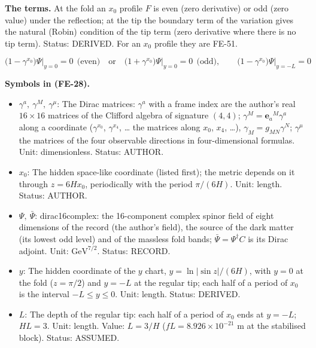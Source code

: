 \documentclass[
  10pt,
]{article}
\providecommand{\tightlist}{%
  \setlength{\itemsep}{0pt}\setlength{\parskip}{0pt}}
\begin{document}
\textbf{The terms.} At the fold an \(x_0\) profile \(F\) is even (zero
derivative) or odd (zero value) under the reflection; at the tip the
boundary term of the variation gives the natural (Robin) condition of
the tip term (zero derivative where there is no tip term). Status:
DERIVED. For an \(x_0\) profile they are FE-51.

\[
\big(1 - \gamma^{x_0}\big)\Psi\big\vert_{y=0} = 0\ \ \text{(even)}\quad\text{or}\quad
\big(1 + \gamma^{x_0}\big)\Psi\big\vert_{y=0} = 0\ \ \text{(odd)},\qquad
\big(1 - \gamma^{x_0}\big)\Psi\big\vert_{y=-L} = 0 \tag{FE-28}
\]

\textbf{Symbols in (FE-28).}

\begin{itemize}
\tightlist
\item
  \(\gamma^a,\ \gamma^M,\ \gamma^\mu\): The Dirac matrices: \(\gamma^a\)
  with a frame index are the author's real \(16 \times 16\) matrices of
  the Clifford algebra of signature \((4, 4)\);
  \(\gamma^M = \mathbf{e}_a{}^M\gamma^a\) along a coordinate
  (\(\gamma^{x_0}\), \(\gamma^{x_4}\), \ldots{} the matrices along
  \(x_0\), \(x_4\), \ldots), \(\gamma_M = g_{MN}\gamma^N\);
  \(\gamma^\mu\) the matrices of the four observable directions in
  four-dimensional formulas. Unit: dimensionless. Status: AUTHOR.
\item
  \(x_0\): The hidden space-like coordinate (listed first); the metric
  depends on it through \(z = 6Hx_0\), periodically with the period
  \(\pi/(6H)\). Unit: length. Status: AUTHOR.
\item
  \(\Psi,\ \bar\Psi\): dirac16complex: the 16-component complex spinor
  field of eight dimensions of the record (the author's field), the
  source of the dark matter (its lowest odd level) and of the massless
  fold bands; \(\bar\Psi = \Psi^\dagger C\) is its Dirac adjoint. Unit:
  \(\mathrm{GeV}^{7/2}\). Status: RECORD.
\item
  \(y\): The hidden coordinate of the \(y\) chart,
  \(y = \ln\lvert\sin z\rvert/(6H)\), with \(y = 0\) at the fold
  (\(z = \pi/2\)) and \(y = -L\) at the regular tip; each half of a
  period of \(x_0\) is the interval \(-L \le y \le 0\). Unit: length.
  Status: DERIVED.
\item
  \(L\): The depth of the regular tip: each half of a period of \(x_0\)
  ends at \(y = -L\); \(HL = 3\). Unit: length. Value: \(L = 3/H\)
  (\(fL = 8.926\times10^{-21}\) m at the stabilised block). Status:
  ASSUMED.
\end{itemize}
\end{document}
